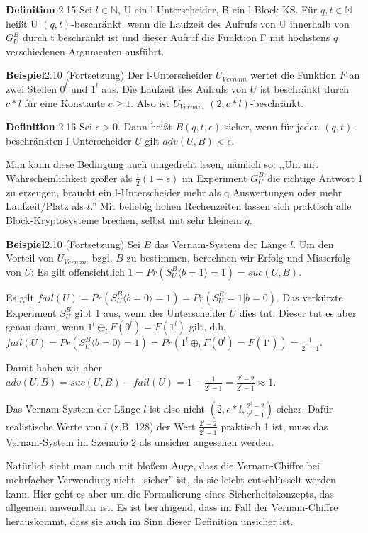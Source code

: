 \documentclass[a4paper]{article}
\begin{document}
\begin{multicols}{3}
    \textbf{Definition} 2.15 Sei $l\in\mathbb{N}$, U ein l-Unterscheider, B ein l-Block-KS. Für $q,t\in\mathbb{N}$ heißt U $(q,t)$-beschränkt, wenn die Laufzeit des Aufrufs von U innerhalb von $G^B_U$ durch t beschränkt ist und dieser Aufruf die Funktion F mit höchstens $q$ verschiedenen Argumenten ausführt.

    \textbf{Beispiel}2.10 (Fortsetzung) Der l-Unterscheider $U_{Vernam}$ wertet die Funktion $F$ an zwei Stellen $0^l$ und $1^l$ aus. Die Laufzeit des Aufrufs von $U$ ist beschränkt durch $c*l$ für eine Konstante $c\geq 1$. Also ist $U_{Vernam}$ $(2,c*l)$-beschränkt.

    \textbf{Definition} 2.16 Sei $\epsilon>0$. Dann heißt $B(q,t,\epsilon)$-sicher, wenn für jeden $(q,t)$-beschränkten l-Unterscheider $U$ gilt $adv(U,B)< \epsilon$.

    Man kann diese Bedingung auch umgedreht lesen, nämlich so: ,,Um mit Wahrscheinlichkeit größer als $\frac{1}{2}(1 +\epsilon)$ im Experiment $G^B_U$ die richtige Antwort 1 zu erzeugen, braucht ein l-Unterscheider mehr als q Auswertungen oder mehr Laufzeit/Platz als $t$.'' Mit beliebig hohen Rechenzeiten lassen sich praktisch alle Block-Kryptosysteme brechen, selbst mit sehr kleinem $q$.

    \textbf{Beispiel}2.10 (Fortsetzung) Sei $B$ das Vernam-System der Länge $l$. Um den Vorteil von $U_{Vernam}$ bzgl. $B$ zu bestimmen, berechnen wir Erfolg und Misserfolg von $U$: Es gilt offensichtlich $1=Pr(S^B_U\langle b= 1\rangle = 1) = suc(U,B)$.

    Es gilt $fail(U) = Pr(S^B_U\langle b= 0\rangle = 1) = Pr(S_U^B= 1|b= 0)$. Das verkürzte Experiment $S_U^B$ gibt 1 aus, wenn der Unterscheider $U$ dies tut. Dieser tut es aber genau dann, wenn $1^l\oplus_l F(0^l) =F(1^l)$ gilt, d.h. $fail(U) = Pr(S_U^B\langle b= 0\rangle = 1) = Pr(1^l\oplus_l F(0^l) =F(1^l)) = \frac{1}{2^l- 1}$.

    Damit haben wir aber $adv(U,B) = suc(U,B)-fail(U) = 1-\frac{1}{2^l- 1}=\frac{2^l-2}{2^l-1}\approx 1$.

    Das Vernam-System der Länge $l$ ist also nicht $(2,c*l,\frac{2^l- 2}{2^l- 1})$-sicher. Dafür realistische Werte von $l$ (z.B. 128) der Wert $\frac{2^l-2}{2^l-1}$ praktisch 1 ist, muss das Vernam-System im Szenario 2 als unsicher angesehen werden.

    Natürlich sieht man auch mit bloßem Auge, dass die Vernam-Chiffre bei mehrfacher Verwendung nicht ,,sicher'' ist, da sie leicht entschlüsselt werden kann. Hier geht es aber um die Formulierung eines Sicherheitskonzepts, das allgemein anwendbar ist. Es ist beruhigend, dass im Fall der Vernam-Chiffre herauskommt, dass sie auch im Sinn dieser Definition unsicher ist.


\end{multicols}
\end{document}
